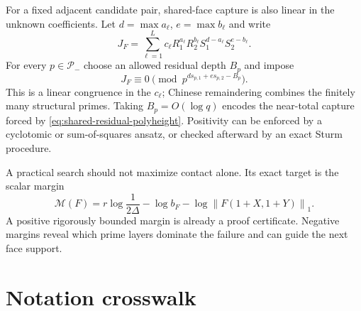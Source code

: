 \documentclass[11pt,oneside]{article}
\theoremstyle{definition}
\theoremstyle{remark}
\newcommand{\normone}[1]{\left\lVert #1\right\rVert_1}
\begin{document}
For a fixed adjacent candidate pair, shared-face capture is also linear in the unknown
coefficients.  Let $d=\max a_\ell$, $e=\max b_\ell$ and write
\begin{equation}
 J_F=\sum_{\ell=1}^L c_\ell
 R_1^{a_\ell}R_2^{b_\ell}
 S_1^{d-a_\ell}S_2^{e-b_\ell}.
 \label{eq:milp-cleared-linear-form}
\end{equation}
For every $p\in\mathcal P_-$ choose an allowed residual depth $B_p$ and impose
\begin{equation}
 J_F\equiv0
 \pmod{p^{d s_{p,1}+e s_{p,2}-B_p}}.
 \label{eq:milp-shared-congruence}
\end{equation}
This is a linear congruence in the $c_\ell$; Chinese remaindering combines the finitely many
structural primes.  Taking $B_p=O(\log q)$ encodes the near-total capture forced by
\eqref{eq:shared-residual-polyheight}.  Positivity can be enforced by a cyclotomic or
sum-of-squares ansatz, or checked afterward by an exact Sturm procedure.

A practical search should not maximize contact alone.  Its exact target is the scalar margin
\begin{equation}
 \mathcal M(F)=
 r\log\frac1{2\Delta}
 -\log b_F
 -\log\normone{F(1+X,1+Y)}.
 \label{eq:search-margin}
\end{equation}
A positive rigorously bounded margin is already a proof certificate.  Negative margins reveal
which prime layers dominate the failure and can guide the next face support.

\section{Notation crosswalk}
\label{app:notation}
\end{document}
